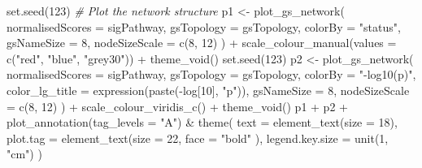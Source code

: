 \documentclass[9pt,a4paper,]{extarticle}
\newenvironment{Shaded}{\begin{snugshade}}{\end{snugshade}}
\newcommand{\AttributeTok}[1]{\textcolor[rgb]{0.77,0.63,0.00}{#1}}
\newcommand{\CommentTok}[1]{\textcolor[rgb]{0.56,0.35,0.01}{\textit{#1}}}
\newcommand{\DecValTok}[1]{\textcolor[rgb]{0.00,0.00,0.81}{#1}}
\newcommand{\FunctionTok}[1]{\textcolor[rgb]{0.00,0.00,0.00}{#1}}
\newcommand{\NormalTok}[1]{#1}
\newcommand{\OtherTok}[1]{\textcolor[rgb]{0.56,0.35,0.01}{#1}}
\newcommand{\SpecialCharTok}[1]{\textcolor[rgb]{0.00,0.00,0.00}{#1}}
\newcommand{\StringTok}[1]{\textcolor[rgb]{0.31,0.60,0.02}{#1}}
\begin{document}
\begin{Shaded}
\begin{Highlighting}[]
\FunctionTok{set.seed}\NormalTok{(}\DecValTok{123}\NormalTok{)}
\CommentTok{\# Plot the network structure}
\NormalTok{p1 }\OtherTok{\textless{}{-}} \FunctionTok{plot\_gs\_network}\NormalTok{(}
  \AttributeTok{normalisedScores =}\NormalTok{ sigPathway, }\AttributeTok{gsTopology =}\NormalTok{ gsTopology, }
  \AttributeTok{colorBy =} \StringTok{"status"}\NormalTok{, }\AttributeTok{gsNameSize =} \DecValTok{8}\NormalTok{, }
  \AttributeTok{nodeSizeScale =} \FunctionTok{c}\NormalTok{(}\DecValTok{8}\NormalTok{, }\DecValTok{12}\NormalTok{)}
\NormalTok{) }\SpecialCharTok{+}
  \FunctionTok{scale\_colour\_manual}\NormalTok{(}\AttributeTok{values =} \FunctionTok{c}\NormalTok{(}\StringTok{"red"}\NormalTok{, }\StringTok{"blue"}\NormalTok{, }\StringTok{"grey30"}\NormalTok{)) }\SpecialCharTok{+}
  \FunctionTok{theme\_void}\NormalTok{()}
\FunctionTok{set.seed}\NormalTok{(}\DecValTok{123}\NormalTok{)}
\NormalTok{p2 }\OtherTok{\textless{}{-}} \FunctionTok{plot\_gs\_network}\NormalTok{(}
  \AttributeTok{normalisedScores =}\NormalTok{ sigPathway,}
  \AttributeTok{gsTopology =}\NormalTok{ gsTopology, }
  \AttributeTok{colorBy  =} \StringTok{"{-}log10(p)"}\NormalTok{, }
  \AttributeTok{color\_lg\_title =} \FunctionTok{expression}\NormalTok{(}\FunctionTok{paste}\NormalTok{(}\SpecialCharTok{{-}}\NormalTok{log[}\DecValTok{10}\NormalTok{], }\StringTok{"p"}\NormalTok{)),}
  \AttributeTok{gsNameSize =} \DecValTok{8}\NormalTok{, }
  \AttributeTok{nodeSizeScale =} \FunctionTok{c}\NormalTok{(}\DecValTok{8}\NormalTok{, }\DecValTok{12}\NormalTok{)}
\NormalTok{) }\SpecialCharTok{+}
  \FunctionTok{scale\_colour\_viridis\_c}\NormalTok{() }\SpecialCharTok{+}
  \FunctionTok{theme\_void}\NormalTok{()}
\NormalTok{p1 }\SpecialCharTok{+}\NormalTok{ p2 }\SpecialCharTok{+} \FunctionTok{plot\_annotation}\NormalTok{(}\AttributeTok{tag\_levels =} \StringTok{"A"}\NormalTok{) }\SpecialCharTok{\&}
    \FunctionTok{theme}\NormalTok{(}
        \AttributeTok{text =} \FunctionTok{element\_text}\NormalTok{(}\AttributeTok{size =} \DecValTok{18}\NormalTok{),}
        \AttributeTok{plot.tag =} \FunctionTok{element\_text}\NormalTok{(}\AttributeTok{size =} \DecValTok{22}\NormalTok{, }\AttributeTok{face =} \StringTok{"bold"}\NormalTok{ ), }
        \AttributeTok{legend.key.size =} \FunctionTok{unit}\NormalTok{(}\DecValTok{1}\NormalTok{, }\StringTok{"cm"}\NormalTok{)}
\NormalTok{    )}
\end{Highlighting}
\end{Shaded}
\end{document}
